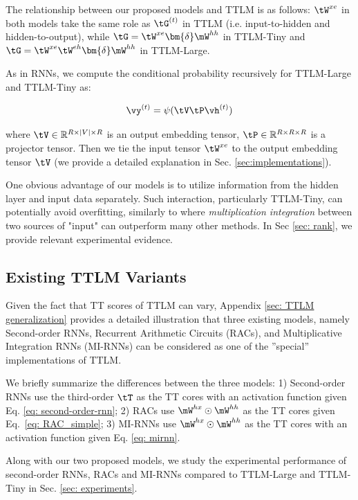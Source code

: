 \documentclass{article}
\theoremstyle{plain}
\theoremstyle{definition}
\theoremstyle{remark}
\begin{document}
The relationship between our proposed models and TTLM is as follows: $\tW^{xe}$ in both models take the same role as $\tG^{(t)}$ in TTLM (i.e. input-to-hidden and hidden-to-output), while  $\tG = \tW^{xe} \bm{\delta} \mW^{hh}$ in TTLM-Tiny and $\tG = \tW^{xe} \tW^{eh} \bm{\delta} \mW^{hh}$ in TTLM-Large.   


As in RNNs, we compute the conditional probability recursively for TTLM-Large and TTLM-Tiny as:

\begin{equation}
\vy^{(t)} = \psi (\tV\tP\vh^{(t)})
\end{equation}

where $\tV\in\mathbb{R}^{R \times |V|\times R}$ is an output embedding tensor, $\tP\in\mathbb{R}^{R \times R\times R}$ is a projector tensor. Then we tie the input tensor $\tW^{xe}$ to the output embedding tensor $\tV$ (we provide a detailed explanation in Sec. \ref{sec:implementations}).

One obvious advantage of our models is to utilize information from the hidden layer and input data separately. Such interaction, particularly TTLM-Tiny, can potentially avoid overfitting, similarly to \cite{wu_multiplicative_2016} where \textit{multiplication integration} between two sources of "input" can outperform many other methods. In Sec \ref{sec: rank}, we provide relevant experimental evidence.



\subsection{Existing  TTLM Variants} 
\label{sec: Existing  TTLM variants}
Given the fact that TT scores of TTLM can vary,  Appendix \ref{sec: TTLM generalization} provides a detailed illustration that three existing models, namely Second-order RNNs,  Recurrent Arithmetic Circuits (RACs), and Multiplicative Integration RNNs (MI-RNNs)  can be considered as one of the ”special” implementations of TTLM. 

We briefly summarize the differences between the three models: 1) Second-order RNNs use the third-order $\tT$ as the TT cores with an activation function given Eq. \ref{eq: second-order-rnn}; 2)
RACs use $\mW^{hx} \odot \mW^{hh}$ as the TT cores given Eq.\ \ref{eq: RAC_simple};  3) MI-RNNs use $\mW^{hx} \odot \mW^{hh}$  as the TT cores with an activation function given Eq. \ref{eq: mirnn}. 

Along with our two proposed models, we study the experimental performance of second-order RNNs, RACs and MI-RNNs compared to TTLM-Large and TTLM-Tiny in Sec. \ref{sec: experiments}.
\end{document}
